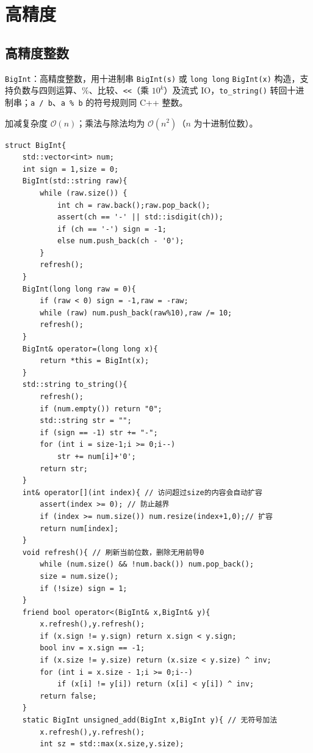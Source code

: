 \section{高精度}

\subsection{高精度整数}

\verb|BigInt|：高精度整数，用十进制串 \verb|BigInt(s)| 或 \texttt{long long} \verb|BigInt(x)| 构造，支持负数与四则运算、$\%$、比较、\verb|<<|（乘 $10^k$）及流式 IO，\verb|to_string()| 转回十进制串；\verb|a / b|、\verb|a % b| 的符号规则同 C++ 整数。

加减复杂度 $\mathcal{O}(n)$；乘法与除法均为 $\mathcal{O}(n^2)$（$n$ 为十进制位数）。

\begin{lstlisting}
struct BigInt{
    std::vector<int> num;
    int sign = 1,size = 0;
    BigInt(std::string raw){
        while (raw.size()) {
            int ch = raw.back();raw.pop_back();
            assert(ch == '-' || std::isdigit(ch));
            if (ch == '-') sign = -1;
            else num.push_back(ch - '0');
        }
        refresh();
    }
    BigInt(long long raw = 0){
        if (raw < 0) sign = -1,raw = -raw;
        while (raw) num.push_back(raw%10),raw /= 10;
        refresh();
    }
    BigInt& operator=(long long x){
        return *this = BigInt(x);
    }
    std::string to_string(){
        refresh();
        if (num.empty()) return "0";
        std::string str = "";
        if (sign == -1) str += "-";
        for (int i = size-1;i >= 0;i--)
            str += num[i]+'0';
        return str;
    }
    int& operator[](int index){ // 访问超过size的内容会自动扩容
        assert(index >= 0); // 防止越界
        if (index >= num.size()) num.resize(index+1,0);// 扩容
        return num[index];
    }
    void refresh(){ // 刷新当前位数，删除无用前导0
        while (num.size() && !num.back()) num.pop_back();
        size = num.size();
        if (!size) sign = 1;
    }
    friend bool operator<(BigInt& x,BigInt& y){
        x.refresh(),y.refresh();
        if (x.sign != y.sign) return x.sign < y.sign;
        bool inv = x.sign == -1;
        if (x.size != y.size) return (x.size < y.size) ^ inv;
        for (int i = x.size - 1;i >= 0;i--)
            if (x[i] != y[i]) return (x[i] < y[i]) ^ inv;
        return false;
    }
    static BigInt unsigned_add(BigInt x,BigInt y){ // 无符号加法
        x.refresh(),y.refresh();
        int sz = std::max(x.size,y.size);

\end{lstlisting}
